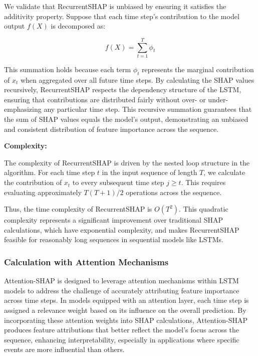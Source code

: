 We validate that RecurrentSHAP is unbiased by ensuring it satisfies the additivity property. Suppose that each time step’s contribution to the model output \( f(X) \) is decomposed as:

\[
f(X) = \sum_{t=1}^{T} \phi_t
\]

This summation holds because each term \( \phi_t \) represents the marginal contribution of \( x_t \) when aggregated over all future time steps. By calculating the SHAP values recursively, RecurrentSHAP respects the dependency structure of the LSTM, ensuring that contributions are distributed fairly without over- or under-emphasizing any particular time step. This recursive summation guarantees that the sum of SHAP values equals the model’s output, demonstrating an unbiased and consistent distribution of feature importance across the sequence.

\textbf{Complexity:}

The complexity of RecurrentSHAP is driven by the nested loop structure in the algorithm. For each time step \( t \) in the input sequence of length \( T \), we calculate the contribution of \( x_t \) to every subsequent time step \( j \geq t \). This requires evaluating approximately \( T(T+1)/2 \) operations across the sequence.

Thus, the time complexity of RecurrentSHAP is \( O(T^2) \). This quadratic complexity represents a significant improvement over traditional SHAP calculations, which have exponential complexity, and makes RecurrentSHAP feasible for reasonably long sequences in sequential models like LSTMs.

\subsubsection{Calculation with Attention Mechanisms}

Attention-SHAP is designed to leverage attention mechanisms within LSTM models to address the challenge of accurately attributing feature importance across time steps. In models equipped with an attention layer, each time step is assigned a relevance weight based on its influence on the overall prediction. By incorporating these attention weights into SHAP calculations, Attention-SHAP produces feature attributions that better reflect the model’s focus across the sequence, enhancing interpretability, especially in applications where specific events are more influential than others.

